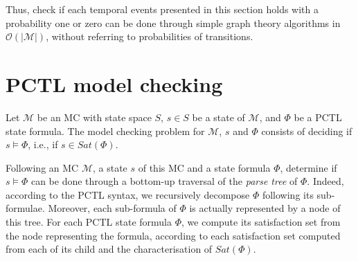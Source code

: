Thus, check if each temporal events presented in this section holds with a probability one or zero can be done through simple graph theory algorithms in $\mathcal{O}(|\mathcal{M}|)$, without referring to probabilities of transitions.

\section{PCTL model checking}
\begin{definition}
Let $\mathcal{M}$ be an MC with state space $S$, $s \in S$ be a state of $\mathcal{M}$, and $\Phi$ be a PCTL state formula. The model checking problem for $\mathcal{M}$, $s$ and $\Phi$ consists of deciding if $s \models \Phi$, i.e., if $s \in Sat(\Phi)$.
\end{definition}
Following an MC $\mathcal{M}$, a state $s$ of this MC and a state formula $\Phi$, determine if $s \models \Phi$ can be done through a bottom-up traversal of the \textit{parse tree} of $\Phi$.
Indeed, according to the PCTL syntax, we recursively decompose $\Phi$ following its sub-formulae. Moreover, each sub-formula of $\Phi$ is actually represented by a node of this tree. For each PCTL state formula $\Phi$, we compute its satisfaction set from the node representing the formula, according to each satisfaction set computed from each of its child and the characterisation of $Sat(\Phi)$.
